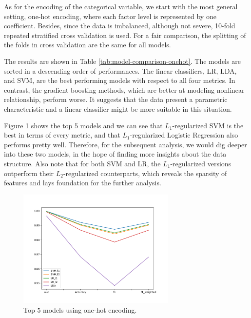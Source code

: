 \documentclass[11pt]{article}
\begin{document}
As for the encoding of the categorical variable, we start with the most general setting, one-hot encoding, where each factor level is represented by one coefficient. Besides, since the data is imbalanced, although not severe, 10-fold repeated stratified cross validation \cite{scikit-learn} is used. For a fair comparison, the splitting of the folds in cross validation are the same for all models.

The results are shown in Table \ref{tab:model-comparison-onehot}. The models are sorted in a descending order of performances. The linear classifiers, LR, LDA, and SVM, are the best performing models with respect to all four metrics. In contrast, the gradient boosting methods, which are better at modeling nonlinear relationship, perform worse. 
It suggests that the data present a parametric characteristic and
a linear classifier might be more suitable in this situation. 

Figure \ref{fig:onehot_top5} shows the top 5 models and we can see that $L_1$-regularized SVM is the best in terms of every metric, and that $L_1$-regularized Logistic Regression also performs pretty well. Therefore, for the subsequent analysis, we would dig deeper into these two models, in the hope of finding more insights about the data structure. Also note that for both SVM and LR, the $L_1$-regularized versions outperform their $L_2$-regularized counterparts, which reveals the sparsity of features and lays foundation for the further analysis.

\begin{figure}[H]
    \centering
    \includegraphics[width=0.7\textwidth]{onehot/top5_model_compare.pdf}
    \caption{Top 5 models using one-hot encoding.}
    \label{fig:onehot_top5}
\end{figure}
\end{document}
